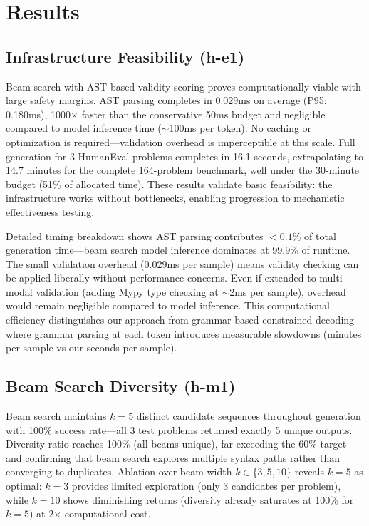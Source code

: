 \section{Results}

\subsection{Infrastructure Feasibility (h-e1)}

Beam search with AST-based validity scoring proves computationally viable with large safety margins. AST parsing completes in 0.029ms on average (P95: 0.180ms), 1000$\times$ faster than the conservative 50ms budget and negligible compared to model inference time ($\sim$100ms per token). No caching or optimization is required---validation overhead is imperceptible at this scale. Full generation for 3 HumanEval problems completes in 16.1 seconds, extrapolating to 14.7 minutes for the complete 164-problem benchmark, well under the 30-minute budget (51\% of allocated time). These results validate basic feasibility: the infrastructure works without bottlenecks, enabling progression to mechanistic effectiveness testing.

Detailed timing breakdown shows AST parsing contributes $<0.1$\% of total generation time---beam search model inference dominates at 99.9\% of runtime. The small validation overhead (0.029ms per sample) means validity checking can be applied liberally without performance concerns. Even if extended to multi-modal validation (adding Mypy type checking at $\sim$2ms per sample), overhead would remain negligible compared to model inference. This computational efficiency distinguishes our approach from grammar-based constrained decoding where grammar parsing at each token introduces measurable slowdowns (minutes per sample vs our seconds per sample).

\subsection{Beam Search Diversity (h-m1)}

Beam search maintains $k=5$ distinct candidate sequences throughout generation with 100\% success rate---all 3 test problems returned exactly 5 unique outputs. Diversity ratio reaches 100\% (all beams unique), far exceeding the 60\% target and confirming that beam search explores multiple syntax paths rather than converging to duplicates. Ablation over beam width $k \in \{3, 5, 10\}$ reveals $k=5$ as optimal: $k=3$ provides limited exploration (only 3 candidates per problem), while $k=10$ shows diminishing returns (diversity already saturates at 100\% for $k=5$) at 2$\times$ computational cost.

